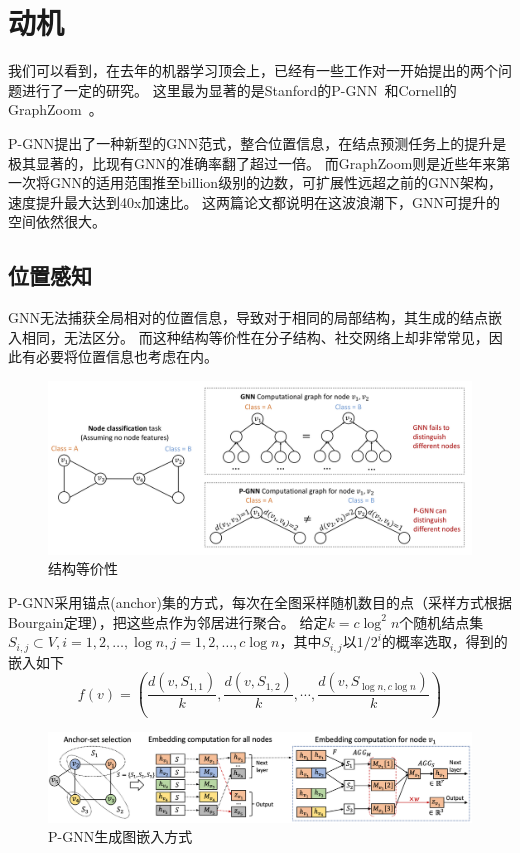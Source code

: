 \documentclass[reportComp]{thesis}
\begin{document}
\section{动机}
我们可以看到，在去年的机器学习顶会上，已经有一些工作对一开始提出的两个问题进行了一定的研究。
这里最为显著的是Stanford的P-GNN~\cite{you:pgnn_icml_2019}和Cornell的GraphZoom~\cite{deng:graphzoom_iclr_2019}。

P-GNN提出了一种新型的GNN范式，整合位置信息，在结点预测任务上的提升是极其显著的，比现有GNN的准确率翻了超过一倍。
而GraphZoom则是近些年来第一次将GNN的适用范围推至billion级别的边数，可扩展性远超之前的GNN架构，速度提升最大达到40x加速比。
这两篇论文都说明在这波浪潮下，GNN可提升的空间依然很大。

\subsection{位置感知}
GNN无法捕获全局相对的位置信息，导致对于相同的局部结构，其生成的结点嵌入相同，无法区分。
而这种结构等价性在分子结构、社交网络上却非常常见，因此有必要将位置信息也考虑在内。
\begin{figure}[H]
\centering
\includegraphics[width=0.8\linewidth]{fig/pgnn-example.png}
\caption{结构等价性}
\end{figure}

P-GNN采用锚点(anchor)集的方式，每次在全图采样随机数目的点（采样方式根据Bourgain定理），把这些点作为邻居进行聚合。
给定$k=c\log^2n$个随机结点集$S_{i,j}\subset V,i=1,2,\ldots,\log n,j=1,2,\ldots,c\log n$，其中$S_{i,j}$以$1/2^i$的概率选取，得到的嵌入如下
\[f(v)=\left(\frac{d(v,S_{1,1})}{k},\frac{d(v,S_{1,2})}{k},\cdots,\frac{d(v,S_{\log n,c\log n})}{k}\right)\]
\begin{figure}[H]
\centering
\includegraphics[width=0.8\linewidth]{fig/PGNN.png}
\caption{P-GNN生成图嵌入方式}
\end{figure}
\end{document}
